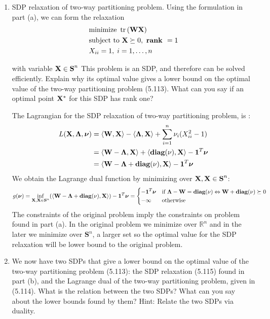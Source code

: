 \documentclass[11pt]{article}
\newcommand{\R}{\mathbb R}
\newcommand{\st}{\text{subject to }}
\newcommand{\minz}{\text{minimize }}
\begin{document}
\begin{enumerate}
	\item SDP relaxation of two-way partitioning problem. Using the formulation in part (a), we can form the relaxation
\begin{align*}
	& \minz \tr{\mat{W} \mat{ X}} \\
	& \st\mat{X} \succeq 0, \text{ \textbf{rank }}  = 1 \\
	&	X_{ii} = 1, \; i =1, \ldots, n
\end{align*}

	with variable ${\mathbf X} \in \textbf{S}^n$
	This problem is an SDP, and therefore can be solved efficiently. 
	Explain why its optimal value gives a lower bound on the optimal value of the two-way partitioning problem (5.113). 
	What can you say if an optimal point  ${\mathbf X}^*$ for this SDP has rank one?

	The Lagrangian for the  SDP relaxation of two-way partitioning problem, is : 
\begin{align*}
	L({\mathbf X}, {\mathbf \Lambda}, \bm{\nu})		&=	\left \langle {\mathbf W}, {\mathbf X}\right \rangle  - \left \langle {\mathbf \Lambda}, {\mathbf X}\right \rangle  + \sum_{i=1}^n \nu_i (X_{ii}^2-1) \\
									&= 	\left \langle {\mathbf W} - {\mathbf \Lambda}, {\mathbf X}\right \rangle + \left \langle \textbf{diag}(\nu), {\mathbf X}\right \rangle -\bm{1}^T \bm{\nu} \\
									&=	\left \langle {\mathbf W}  - {\mathbf \Lambda} + \textbf{diag}(\nu), {\mathbf X}\right \rangle  - \bm{1}^T \bm{\nu}
\end{align*}
	We obtain the Lagrange dual function by minimizing over ${\mathbf X}, {\mathbf X} \in  \textbf{S}^n$:
	\[
		g(\vect{\nu}) = \inf_{\mat{X},  \mat{X} \in  \textbf{S}^n} (\PROD{\mat{W}  - \mat{\Lambda} + \textbf{diag}(\nu)} {\mat{X}})  - \vect{1}^T \vect{\nu} =
		\begin{dcases*}
			           	- \vect{1}^T \vect{\nu}	&  if $\mat{\Lambda} - \mat{W}  =  \textbf{diag}(\nu) \Leftrightarrow \mat{W} + \textbf{diag}(\nu)   \succeq 0 $\\
		        		  	 -\infty & otherwise
		\end{dcases*}
	\]
	The constraints of the original problem imply the constraints on problem found in part (a). In the original problem we minimize over $\R^n$ and in the later we minimize over $\textbf{S}^n$,
	a larger set so the optimal value for the SDP relaxation will be lower bound to the original problem.
	
	\item
	We now have two SDPs that give a lower bound on the optimal value of the two-way partitioning problem (5.113): 
	the SDP relaxation (5.115) found in part (b), and the Lagrange dual of the two-way partitioning problem, given in (5.114). 
	What is the relation between the two SDPs? What can you say about the lower bounds found by them? Hint: Relate the two SDPs via duality.
	

\end{enumerate}
\end{document}

